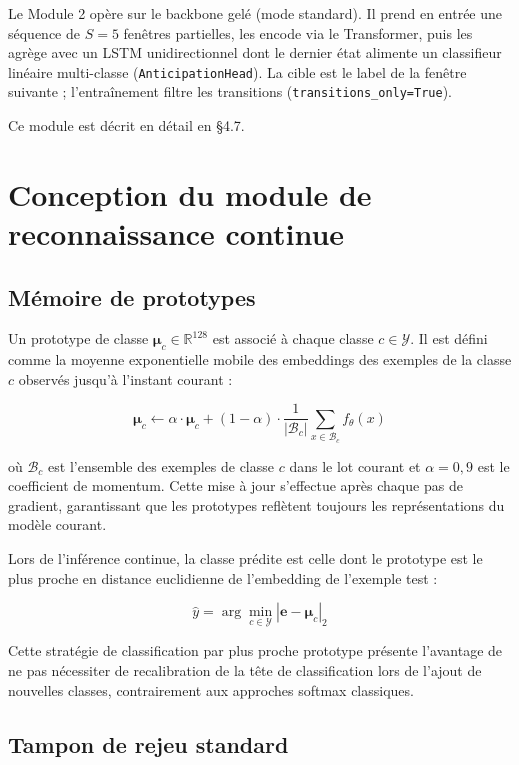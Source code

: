 \documentclass[a4paper,12pt]{report}
\begin{document}
Le Module 2 opère sur le backbone gelé (mode standard). Il prend en entrée une
séquence de $S=5$ fenêtres partielles, les encode via le Transformer, puis les
agrège avec un LSTM unidirectionnel dont le dernier état alimente un
classifieur linéaire multi-classe (\texttt{AnticipationHead}). La cible est le
label de la fenêtre suivante ; l'entraînement filtre les transitions
(\texttt{transitions\_only=True}).

Ce module est décrit en détail en §4.7.

\section{Conception du module de reconnaissance continue}

\subsection{Mémoire de prototypes}

Un prototype de classe $\boldsymbol{\mu}_c \in \mathbb{R}^{128}$ est associé à chaque classe $c \in \mathcal{Y}$. Il est défini comme la moyenne exponentielle mobile des embeddings des exemples de la classe $c$ observés jusqu'à l'instant courant :

$$\boldsymbol{\mu}_c \leftarrow \alpha \cdot \boldsymbol{\mu}_c + (1 - \alpha) \cdot \frac{1}{|\mathcal{B}_c|} \sum_{x \in \mathcal{B}_c} f_\theta(x)$$

où $\mathcal{B}_c$ est l'ensemble des exemples de classe $c$ dans le lot courant et $\alpha = 0{,}9$ est le coefficient de momentum. Cette mise à jour s'effectue après chaque pas de gradient, garantissant que les prototypes reflètent toujours les représentations du modèle courant.

Lors de l'inférence continue, la classe prédite est celle dont le prototype est le plus proche en distance euclidienne de l'embedding de l'exemple test :

$$\hat{y} = \arg\min_{c \in \mathcal{Y}} |\boldsymbol{e} - \boldsymbol{\mu}_c|_2$$

Cette stratégie de classification par plus proche prototype présente l'avantage de ne pas nécessiter de recalibration de la tête de classification lors de l'ajout de nouvelles classes, contrairement aux approches softmax classiques.

\subsection{Tampon de rejeu standard}
\end{document}
